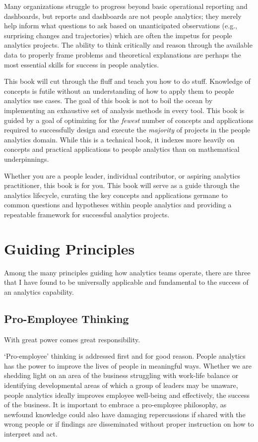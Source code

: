 \documentclass[
]{book}
\begin{document}
Many organizations struggle to progress beyond basic operational reporting and dashboards, but reports and dashboards are not people analytics; they merely help inform what questions to ask based on unanticipated observations (e.g., surprising changes and trajectories) which are often the impetus for people analytics projects. The ability to think critically and reason through the available data to properly frame problems and theoretical explanations are perhaps the most essential skills for success in people analytics.

This book will cut through the fluff and teach you how to do stuff. Knowledge of concepts is futile without an understanding of how to apply them to people analytics use cases. The goal of this book is not to boil the ocean by implementing an exhaustive set of analysis methods in every tool. This book is guided by a goal of optimizing for the \emph{fewest} number of concepts and applications required to successfully design and execute the \emph{majority} of projects in the people analytics domain. While this is a technical book, it indexes more heavily on concepts and practical applications to people analytics than on mathematical underpinnings.

Whether you are a people leader, individual contributor, or aspiring analytics practitioner, this book is for you. This book will serve as a guide through the analytics lifecycle, curating the key concepts and applications germane to common questions and hypotheses within people analytics and providing a repeatable framework for successful analytics projects.

\hypertarget{guiding-principles}{%
\section{Guiding Principles}\label{guiding-principles}}

Among the many principles guiding how analytics teams operate, there are three that I have found to be universally applicable and fundamental to the success of an analytics capability.

\hypertarget{pro-employee-thinking}{%
\subsection{Pro-Employee Thinking}\label{pro-employee-thinking}}

With great power comes great responsibility.

`Pro-employee' thinking is addressed first and for good reason. People analytics has the power to improve the lives of people in meaningful ways. Whether we are shedding light on an area of the business struggling with work-life balance or identifying developmental areas of which a group of leaders may be unaware, people analytics ideally improves employee well-being and effectively, the success of the business. It is important to embrace a pro-employee philosophy, as newfound knowledge could also have damaging repercussions if shared with the wrong people or if findings are disseminated without proper instruction on how to interpret and act.
\end{document}
